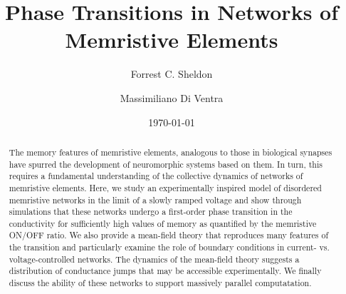 \documentclass[aps,prl,preprint,groupedaddress]{revtex4-1}
\begin{document}

\title{Phase Transitions in Networks of Memristive Elements}


\author{Forrest C. Sheldon}

\author{Massimiliano Di Ventra}


\date{\today}

\begin{abstract}
The memory features of memristive elements, analogous to those in biological
synapses have spurred the development of neuromorphic systems based on them.
In turn, this requires a fundamental understanding of the collective
dynamics of networks of memristive elements.  Here, we study an experimentally
inspired model of disordered memristive networks in the limit of a slowly
ramped voltage and show through simulations that these networks undergo a
first-order phase transition in the conductivity for sufficiently high
values of memory as quantified by the memristive ON/OFF ratio. We also
provide a mean-field theory that reproduces many features of the transition
and particularly examine the role of boundary conditions in current- vs.
voltage-controlled networks.  The dynamics of the mean-field theory suggests
a distribution of conductance jumps that may be accessible experimentally.  We
finally discuss the ability of these networks to support massively
parallel computatation.
\end{abstract}
\end{document}
